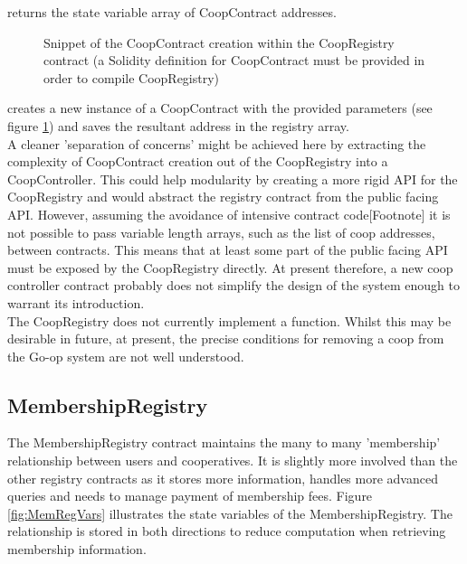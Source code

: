  returns the state variable array of CoopContract addresses. \\
 \begin{figure}
\centering
{}
\decoRule
\caption[CoopRegistry Coop Creation Snippet]{Snippet of the CoopContract creation within the CoopRegistry contract (a Solidity definition for CoopContract must be provided in order to compile CoopRegistry) }
\label{fig:CoopRegistry}
\end{figure}

 creates a new instance of a CoopContract with the provided parameters (see figure \ref{fig:CoopRegistry}) and saves the resultant address in the registry array.\\

A cleaner 'separation of concerns' might be achieved here by extracting the complexity of CoopContract creation out of the CoopRegistry into a CoopController. This could help modularity by creating a more rigid API for the CoopRegistry and would abstract the registry contract from the public facing API. However, assuming the avoidance of intensive contract code[Footnote] it is not possible to pass variable length arrays, such as the list of coop addresses, between contracts. This means that at least some part of the public facing API must be exposed by the CoopRegistry directly. At present therefore, a new coop controller contract probably does not simplify the design of the system enough to warrant its introduction. \\

The CoopRegistry does not currently implement a  function. Whilst this may be desirable in future, at present, the precise conditions for removing a coop from the Go-op system are not well understood. \\

\subsection{MembershipRegistry}
The MembershipRegistry contract maintains the many to many 'membership' relationship between users and cooperatives. It is slightly more involved than the other registry contracts as it stores more information, handles more advanced queries and needs to manage payment of membership fees. Figure \ref{fig:MemRegVars} illustrates the state variables of the MembershipRegistry. The relationship is stored in both directions to reduce computation when retrieving membership information. \\

